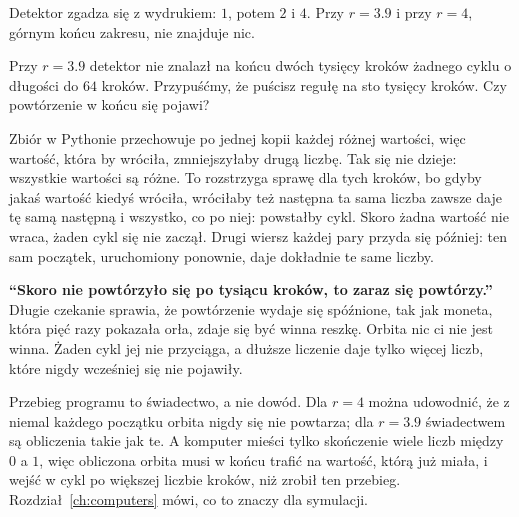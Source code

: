 

\noindent
Detektor zgadza się z wydrukiem: $1$, potem $2$ i $4$. Przy $r = \num{3.9}$
i przy $r = 4$, górnym końcu zakresu, nie znajduje nic.

\begin{think}
Przy $r = \num{3.9}$ detektor nie znalazł na końcu dwóch tysięcy kroków
żadnego cyklu o długości do $64$ kroków. Przypuśćmy, że puścisz regułę na
sto tysięcy kroków. Czy powtórzenie w końcu się pojawi?
\end{think}



\noindent
Zbiór  w Pythonie przechowuje po jednej kopii każdej różnej
wartości, więc wartość, która by wróciła, zmniejszyłaby drugą liczbę. Tak
się nie dzieje: wszystkie  wartości są różne. To
rozstrzyga sprawę dla tych  kroków, bo gdyby jakaś
wartość kiedyś wróciła, wróciłaby też następna \dash{} ta sama liczba zawsze
daje tę samą następną \dash{} i wszystko, co po niej: powstałby cykl. Skoro
żadna wartość nie wraca, żaden cykl się nie zaczął. Drugi wiersz każdej
pary przyda się później: ten sam początek, uruchomiony ponownie, daje
dokładnie te same liczby.

\begin{trapbox}
\textbf{\enquote{Skoro nie powtórzyło się po tysiącu kroków, to zaraz się
powtórzy.}} Długie czekanie sprawia, że powtórzenie wydaje się spóźnione,
tak jak moneta, która pięć razy pokazała orła, zdaje się być winna reszkę.
Orbita nic ci nie jest winna. Żaden cykl jej nie przyciąga, a dłuższe
liczenie daje tylko więcej liczb, które nigdy wcześniej się nie pojawiły.
\end{trapbox}

\begin{rigourbox}
Przebieg programu to świadectwo, a nie dowód. Dla $r = 4$ można udowodnić,
że z niemal każdego początku orbita nigdy się nie powtarza; dla
$r = \num{3.9}$ świadectwem są obliczenia takie jak te. A komputer mieści
tylko skończenie wiele liczb między $0$ a $1$, więc obliczona orbita musi w
końcu trafić na wartość, którą już miała, i wejść w cykl \dash{} po większej
liczbie kroków, niż zrobił ten przebieg. Rozdział~\ref{ch:computers} mówi,
co to znaczy dla symulacji.
\end{rigourbox}

